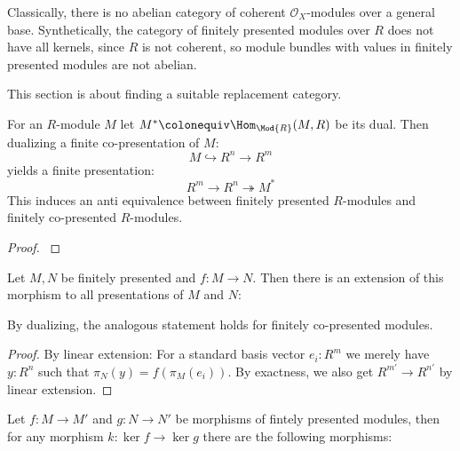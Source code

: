 
Classically, there is no abelian category of coherent $\mathcal O_X$-modules over a general base.
Synthetically, the category of finitely presented modules over $R$ does not have all kernels,
since $R$ is not coherent, so module bundles with values in finitely presented modules are not abelian.

This section is about finding a suitable replacement category.

\begin{theorem}
  For an $R$-module $M$ let $M^\ast\colonequiv \Hom_{\Mod{R}}(M,R)$ be its dual.
  Then dualizing a finite co-presentation of $M$:
  \[ M \hookrightarrow R^n \to R^m \]
  yields a finite presentation:
  \[ R^m \to R^n \twoheadrightarrow M^\ast \]
  This induces an anti equivalence between finitely presented $R$-modules and finitely co-presented $R$-modules.
\end{theorem}

\begin{proof}
  \cite{etale-draft}
\end{proof}

\begin{lemma}
  \label{presentation-extension}
  Let $M,N$ be finitely presented and $f:M\to N$.
  Then there is an extension of this morphism to all presentations of $M$ and $N$:
  \begin{center}
  \end{center}
  By dualizing, the analogous statement holds for finitely co-presented modules.
\end{lemma}

\begin{proof}
  By linear extension: For a standard basis vector $e_i:R^m$ we merely have $y:R^n$ such that $\pi_N(y)=f(\pi_M(e_i))$. By exactness, we also get $R^{m'}\to R^{n'}$ by linear extension.
\end{proof}

\begin{lemma}
  Let $f:M\to M'$ and $g:N\to N'$ be morphisms of fintely presented modules, then for any morphism
  $k:\ker{f}\to \ker{g}$ there are the following morphisms:
  \begin{center}
  \end{center}
\end{lemma}

